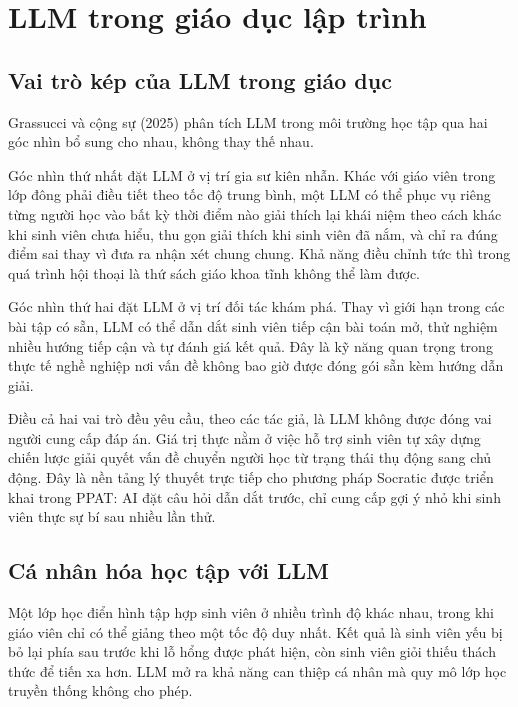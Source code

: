 \documentclass[../main.tex]{subfiles}
\begin{document}
\section{LLM trong giáo dục lập trình}

\subsection{Vai trò kép của LLM trong giáo dục}

Grassucci và cộng sự (2025) phân tích LLM trong môi trường học tập qua hai góc nhìn bổ sung cho nhau, không thay thế nhau.

Góc nhìn thứ nhất đặt LLM ở vị trí gia sư kiên nhẫn. Khác với giáo viên trong lớp đông phải điều tiết theo tốc độ trung bình, một LLM có thể phục vụ riêng từng người học vào bất kỳ thời điểm nào giải thích lại khái niệm theo cách khác khi sinh viên chưa hiểu, thu gọn giải thích khi sinh viên đã nắm, và chỉ ra đúng điểm sai thay vì đưa ra nhận xét chung chung. Khả năng điều chỉnh tức thì trong quá trình hội thoại là thứ sách giáo khoa tĩnh không thể làm được.

Góc nhìn thứ hai đặt LLM ở vị trí đối tác khám phá. Thay vì giới hạn trong các bài tập có sẵn, LLM có thể dẫn dắt sinh viên tiếp cận bài toán mở, thử nghiệm nhiều hướng tiếp cận và tự đánh giá kết quả. Đây là kỹ năng quan trọng trong thực tế nghề nghiệp nơi vấn đề không bao giờ được đóng gói sẵn kèm hướng dẫn giải.

Điều cả hai vai trò đều yêu cầu, theo các tác giả, là LLM không được đóng vai người cung cấp đáp án. Giá trị thực nằm ở việc hỗ trợ sinh viên tự xây dựng chiến lược giải quyết vấn đề chuyển người học từ trạng thái thụ động sang chủ động. Đây là nền tảng lý thuyết trực tiếp cho phương pháp Socratic được triển khai trong PPAT: AI đặt câu hỏi dẫn dắt trước, chỉ cung cấp gợi ý nhỏ khi sinh viên thực sự bí sau nhiều lần thử.

\subsection{Cá nhân hóa học tập với LLM}

Một lớp học điển hình tập hợp sinh viên ở nhiều trình độ khác nhau, trong khi giáo viên chỉ có thể giảng theo một tốc độ duy nhất. Kết quả là sinh viên yếu bị bỏ lại phía sau trước khi lỗ hổng được phát hiện, còn sinh viên giỏi thiếu thách thức để tiến xa hơn. LLM mở ra khả năng can thiệp cá nhân mà quy mô lớp học truyền thống không cho phép.
\end{document}
